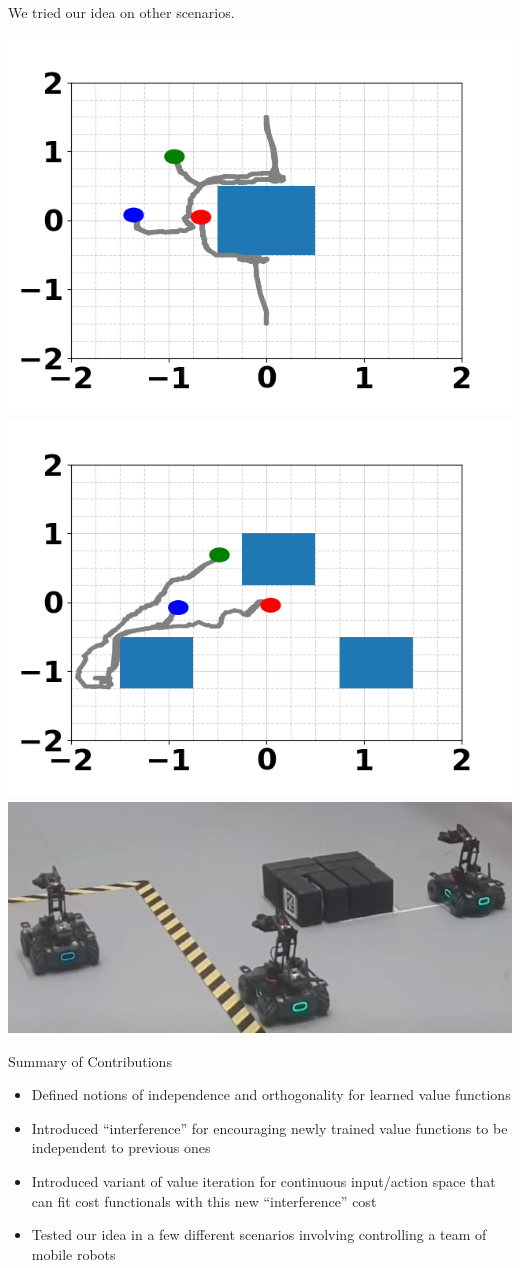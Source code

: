 \begin{frame}{We tried our idea on other scenarios.}
	\begin{minipage}{\textwidth}
		\centering		
		\includegraphics[width=0.4\linewidth]{multRobotSim1}
		\includegraphics[width=0.4\linewidth]{multRobotSim2}
		\includegraphics[width=0.4\linewidth]{multiRobotRoboHub}
	\end{minipage}%
\end{frame}

\begin{frame}{Summary of Contributions}
	\begin{itemize}
		\item{Defined notions of independence and orthogonality for learned value functions}
		\item{Introduced ``interference'' for encouraging newly trained value functions to be independent to previous ones}
		\item{Introduced variant of value iteration for continuous input/action space that can fit cost functionals with this new ``interference'' cost}
		\item{Tested our idea in a few different scenarios involving controlling a team of mobile robots}
	\end{itemize}
\end{frame}




